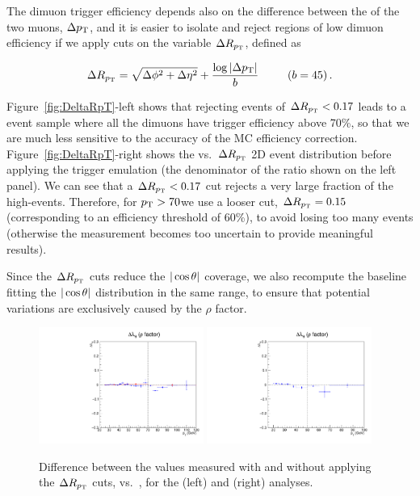 The dimuon trigger efficiency depends also on the difference between the \pt of the two muons, 
$\Delta p_\text{T}$, and it is easier to isolate and reject regions of low dimuon efficiency if 
we apply cuts on the variable $\Delta R_{p_\text{T}}$, defined as

\begin{equation}
\Delta R_{p_\text{T}} = \sqrt{\Delta\phi^2+\Delta\eta^2}+\frac{\log|\Delta p_\text{T}|}{b}\hspace{0.9cm}(b=45) \, .
\end{equation}


Figure~\ref{fig:DeltaRpT}-left shows that rejecting events of $\Delta R_{p_\text{T}} < 0.17$
leads to a \jpsi event sample where all the dimuons have trigger efficiency above 70\%,
so that we are much less sensitive to the accuracy of the MC efficiency correction.
%
Figure~\ref{fig:DeltaRpT}-right shows the \pt vs.\ $\Delta R_{p_\text{T}}$ 2D event distribution 
before applying the trigger emulation (the denominator of the ratio shown on the left panel).
We can see that a $\Delta R_{p_\text{T}} < 0.17$ cut rejects a very large fraction of the high-\pt events.
Therefore, for $p_\text{T} > 70$\GeV we use a looser cut, $\Delta R_{p_\text{T}} = 0.15$ 
(corresponding to an efficiency threshold of 60\%), 
to avoid losing too many events 
(otherwise the \lth measurement becomes too uncertain to provide meaningful results).

Since the $\Delta R_{p_\text{T}}$ cuts reduce the $|\cos\theta|$ coverage,
we also recompute the baseline \lth fitting the $|\cos\theta|$ distribution in the same range, 
to ensure that potential variations are exclusively caused by the $\rho$ factor.

\begin{figure}[h]
\centering
\includegraphics[width=0.48\textwidth]{Figures/chapter6/lth_absDiff_rho-jpsi.pdf}
\includegraphics[width=0.48\textwidth]{Figures/chapter6/lth_absDiff_rho-psip.pdf}
\caption{Difference between the \lth values measured with and without
applying the $\Delta R_{p_\text{T}}$ cuts, vs.\ \pt, for the \jpsi (left) and \psip (right) analyses.}
\label{fig:lth_absDiff_rho}
\end{figure}


